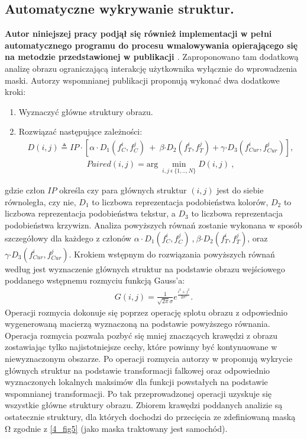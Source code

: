 \documentclass[a4paper,12pt,twoside,openany]{report}
\begin{document}
\subsection{Automatyczne wykrywanie struktur.}
\textbf{Autor niniejszej pracy podjął się również implementacji w pełni automatycznego programu do procesu wmalowywania opierającego się na metodzie przedstawionej w publikacji \cite{SalientStrucTexProp}}. Zaproponowano tam  dodatkową analizę obrazu ograniczającą interakcję użytkownika wyłącznie do wprowadzenia maski. Autorzy wspomnianej publikacji proponują wykonać dwa dodatkowe kroki:
\begin{enumerate}
\item
Wyznaczyć główne struktury obrazu.
\item
Rozwiązać następujące zależności:
\begin{align}
D(i,j)\triangleq IP\cdot \left[\alpha \cdot D_1\left(f^i_C,f^j_C\right)\ +\ \beta {\cdot D}_2\left(f^i_T,f^j_T\right)+\gamma {\cdot D}_3\left(f^i_{Cur},f^j_{Cur}\right)\right],
\label{SalientDistance}
\end{align}
\begin{align}
Paired\left(i,j\right)={\mathrm{arg}\ \mathop{\mathrm{min}}_{i,j\ \epsilon \mathrm{\ }\{1,..,N\}} D(i,j)\ },
\label{SalientPair}
\end{align}
\end{enumerate}
gdzie człon $IP$ określa czy para głównych struktur $(i,j)$ jest do siebie równoległa, czy nie, $D_1$ to liczbowa reprezentacja podobieństwa kolorów, $D_2$ to liczbowa reprezentacja podobieństwa tekstur, a $D_3$ to liczbowa reprezentacja podobieństwa krzywizn. 
Analiza powyższych równań zostanie wykonana w sposób szczegółowy dla każdego z członów $\alpha \cdot D_1\left(f^i_C,f^j_C\right)\ $,$\ \beta {\cdot D}_2\left(f^i_T,f^j_T\right)$, oraz $\gamma {\cdot D}_3\left(f^i_{Cur},f^j_{Cur}\right)$. Krokiem wstępnym do rozwiązania powyższych równań według \cite{SalientStrucTexProp} jest wyznaczenie głównych struktur na podstawie obrazu wejściowego poddanego wstępnemu rozmyciu funkcją Gauss'a:
\begin{align}
G\left(i,j\right)=\frac{1}{\sqrt{2\pi }\sigma }e^{\frac{i^2+j^2}{2{\sigma }^2}}.
\label{rozmycieGaussa}
\end{align}
Operacji rozmycia dokonuje się poprzez operację splotu obrazu z odpowiednio wygenerowaną macierzą wyznaczoną na podstawie powyższego równania. Operacja rozmycia pozwala pozbyć się mniej znaczących krawędzi z obrazu zostawiając tylko najistotniejsze cechy, które powinny być kontynuowane w niewyznaczonym obszarze. Po operacji rozmycia autorzy w \cite{SalientStrucTexProp} proponują wykrycie głównych struktur na podstawie transformacji falkowej oraz odpowiednio wyznaczonych lokalnych maksimów dla funkcji powstałych na podstawie wspomnianej transformacji. Po tak  przeprowadzonej operacji uzyskuje się wszystkie główne struktury obrazu. Zbiorem krawędzi poddanych analizie są ostatecznie struktury, dla których dochodzi do przecięcia ze zdefiniowaną maską $\mathrm{\Omega }$ zgodnie z \autoref{4_fig5} (jako maska traktowany jest samochód).
\end{document}

